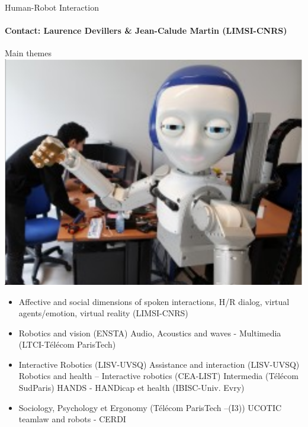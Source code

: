 \begin{frame}{Human-Robot Interaction}
\framesubtitle{Contact: Laurence Devillers \& Jean-Calude Martin (LIMSI-CNRS) }

\begin{minipage}[c]{.3\linewidth}
Main themes\\

\includegraphics[width=\linewidth]{Images/hr2.png}
\end{minipage} 
\hfill
\begin{minipage}[c]{.67\linewidth}
\begin{itemize}
\item Affective and social dimensions of spoken interactions, H/R dialog, virtual agents/emotion, virtual reality  (LIMSI-CNRS)
\item Robotics and vision (ENSTA) Audio, Acoustics and waves -  Multimedia (LTCI-Télécom ParisTech)
\item Interactive Robotics (LISV-UVSQ) Assistance and interaction (LISV-UVSQ) Robotics and health – Interactive robotics (CEA-LIST)
Intermedia (Télécom SudParis) HANDS - HANDicap et health (IBISC-Univ. Evry)
\item Sociology, Psychology et Ergonomy (Télécom ParisTech –(I3)) UCOTIC teamlaw and robots - CERDI
\end{itemize}
\end{minipage} 

\end{frame}

